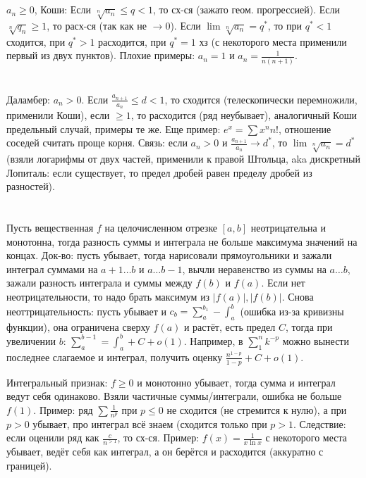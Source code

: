\section{} %
$a_n \ge 0$, Коши:
Если $\sqrt[n]{a_n} \le q < 1$, то сх-ся (зажато геом. прогрессией). 
Если $\sqrt[n]{q_n} \ge 1$, то расх-ся (так как не $\to 0$).
Если $\lim \sqrt[n]{a_n} = q^*$, то при $q^* < 1$ сходится, при $q^* > 1$ расходится, при $q^*=1$ хз (с некоторого места применили первый из двух пунктов).
Плохие примеры: $a_n=1$ и $a_n=\frac{1}{n(n+1)}$.

\section{} %
Даламбер: $a_n > 0$.
Если $\frac{a_{n+1}}{a_n} \le d < 1$, то сходится (телескопически перемножили, применили Коши), если $\ge 1$, то расходится (ряд неубывает),
аналогичный Коши предельный случай, примеры те же.
Еще пример: $e^x=\sum {x^n}{n!}$, отношение соседей считать проще корня.
Связь: если $a_n > 0$ и $\frac{a_{n+1}}{a_n} \to d^*$, то $\lim \sqrt[n]{a_n} = d^*$ (взяли логарифмы от двух частей,
применили к правой Штольца, aka дискретный Лопиталь: если существует, то предел дробей равен пределу дробей из разностей).

\section{} %
Пусть вещественная $f$ на целочисленном отрезке $[a,b]$ неотрицательна и монотонна, тогда разность суммы и интеграла не больше
максимума значений на концах.
Док-во: пусть убывает, тогда нарисовали прямоугольники и зажали интеграл суммами на $a+1\dots b$ и $a\dots b-1$,
вычли неравенство из суммы на $a\dots b$, зажали разность интеграла и суммы между $f(b)$ и $f(a)$.
Если нет неотрицательности, то надо брать максимум из $|f(a)|, |f(b)|$.
Снова неоттрицательность: пусть убывает и $c_b = \sum_a^{b_1} - \int_a^b$ (ошибка из-за кривизны функции), она ограничена сверху $f(a)$ и растёт,
есть предел $C$, тогда при увеличении $b$: $\sum_a^{b-1} = \int_a^b + C + o(1)$.
Например, в $\sum_1^n k^{-p}$ можно вынести последнее слагаемое и интеграл, получить оценку $\frac{n^{1-p}}{1-p} + C + o(1)$.

Интегральный признак: $f \ge 0$ и монотонно убывает, тогда сумма и интеграл ведут себя одинаково.
Взяли частичные суммы/интеграли, ошибка не больше $f(1)$.
Пример: ряд $\sum \frac{1}{n^p}$ при $p\le0$ не сходится (не стремится к нулю), а при $p>0$ убывает, про интеграл всё знаем (сходится только при $p>1$.
Следствие: если оценили ряд как $\frac{c}{n^{>1}}$, то сх-ся.
Пример: $f(x)=\frac{1}{x \ln x}$ с некоторого места убывает, ведёт себя как интеграл, а он берётся и расходится (аккуратно с границей).

